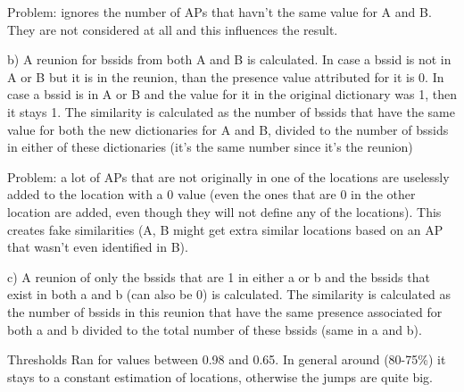 Problem: ignores the number of APs that havn’t the same value for A and B. They are not considered at all and this influences the result.


b) A reunion for bssids from both A and B is calculated. In case a bssid is not in A or B but it is in the reunion, than the presence value attributed for it is 0. In case a bssid is in A or B and the value for it in the original dictionary was 1, then it stays 1. The similarity is calculated as the number of bssids that have the same value for both the new dictionaries for A and B, divided to the number of bssids in either of these dictionaries (it's the same number since it's the reunion)

Problem: a lot of APs that are not originally in one of the locations are uselessly added to the location with a 0 value (even the ones that are 0 in the other location are added, even though they will not define any of the locations). This creates fake similarities (A, B might get extra similar locations based on an AP that wasn’t even identified in B).

c) A reunion of only the bssids that are 1 in either a or b and the bssids that exist in both a and b (can also be 0) is calculated. The similarity is calculated as the number of bssids in this reunion that have the same presence associated for both a and b divided to the total number of these bssids (same in a and b).

Thresholds
Ran for values between 0.98 and 0.65. In general around (80-75\%) it stays to a
constant estimation of locations, otherwise the jumps are quite big.
